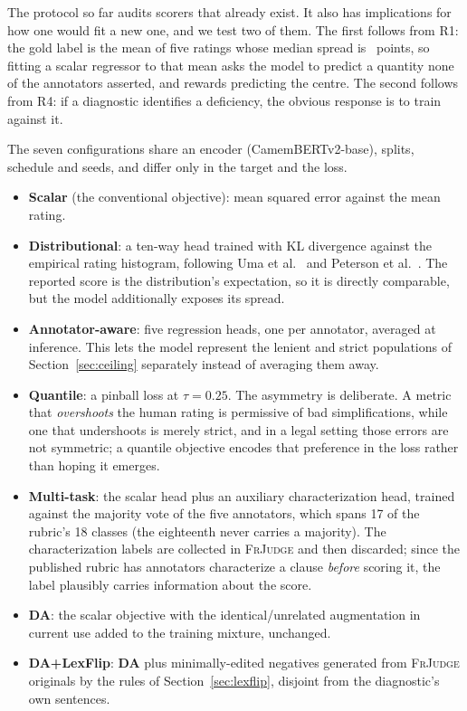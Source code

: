 \documentclass{BVP_JCLLT}
\begin{document}
The protocol so far audits scorers that already exist. It also has implications
for how one would fit a new one, and we test two of them. The first follows from
R1: the gold label is the mean of five ratings whose median spread is
\medianRange\ points, so fitting a scalar regressor to that mean asks the model
to predict a quantity none of the annotators asserted, and rewards predicting
the centre. The second follows from R4: if a diagnostic identifies a deficiency,
the obvious response is to train against it.

The seven configurations share an encoder (CamemBERTv2-base), splits, schedule
and seeds, and differ only in the target and the loss.

\begin{itemize}\itemsep2pt
\item \textbf{Scalar} (the conventional objective): mean squared error against
      the mean rating.
\item \textbf{Distributional}: a ten-way head trained with KL divergence against
      the empirical rating histogram, following Uma et al.\ \cite{uma2021learning}
      and Peterson et al.\ \cite{peterson2019human}. The reported score is the
      distribution's expectation, so it is directly comparable, but the model
      additionally exposes its spread.
\item \textbf{Annotator-aware}: five regression heads, one per annotator,
      averaged at inference. This lets the model represent the lenient and
      strict populations of Section~\ref{sec:ceiling} separately instead of
      averaging them away.
\item \textbf{Quantile}: a pinball loss \cite{koenker1978regression} at
      $\tau=0.25$. The asymmetry is deliberate. A metric that \emph{overshoots}
      the human rating is permissive of bad simplifications, while one that
      undershoots is merely strict, and in a legal setting those errors are not
      symmetric; a quantile objective encodes that preference in the loss rather
      than hoping it emerges.
\item \textbf{Multi-task}: the scalar head plus an auxiliary characterization
      head, trained against the majority vote of the five annotators, which
      spans 17 of the rubric's 18 classes (the eighteenth never carries a
      majority). The characterization labels are collected in \textsc{FrJudge}
      and then discarded; since the published rubric has annotators characterize
      a clause \emph{before} scoring it, the label plausibly carries information
      about the score.
\item \textbf{DA}: the scalar objective with the identical/unrelated
      augmentation in current use added to the training mixture, unchanged.
\item \textbf{DA+LexFlip}: \textbf{DA} plus minimally-edited negatives generated
      from \textsc{FrJudge} originals by the rules of Section~\ref{sec:lexflip},
      disjoint from the diagnostic's own sentences.
\end{itemize}
\end{document}
